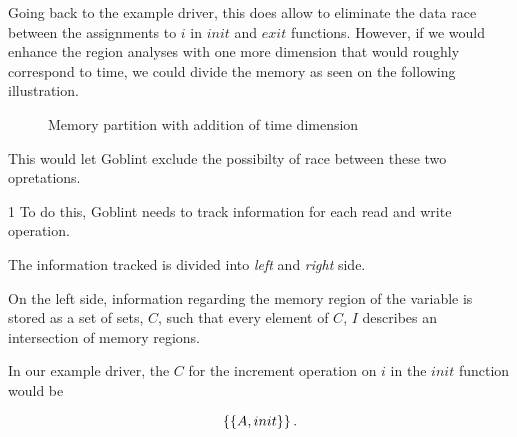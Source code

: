 \documentclass[..thesis.tex]{subfiles}
\newcommand{\opacity}{0.8}
\newcommand{\drawcube}[7]
{
      \filldraw[opacity=\opacity, #7, draw=black, dashed, xzp=#2] (#1,#3) rectangle (#4,#6);
      \filldraw[opacity=\opacity, #7, draw=black, dashed, xzp=#5] (#1,#3) rectangle (#4,#6);
      \filldraw[opacity=\opacity, #7, draw=black, dashed, xyp=#3] (#1,#2) rectangle (#4,#5);
      \filldraw[opacity=\opacity, #7, draw=black, dashed, xyp=#6] (#1,#2) rectangle (#4,#5);
      \filldraw[opacity=\opacity, #7, draw=black, dashed, yzp=#4] (#2,#3) rectangle (#5,#6);
}
\newcommand{\drawcubeoverz}[5]
{
 \drawcube{#1}{#2}{0}{#3}{#4}{\cubez}{#5}
}
\newcommand{\drawoutercube}
{
      \draw[thick,-] (0,0,0) -- ++(\cubex,0,0) -- ++(0,0,\cubez) -- node [anchor = north] {$B$} ++(-0.5*\cubex,0,0) --  node [anchor = north] {$A$} ++(-0.5*\cubex,0,0)  --   ++(0,0,-\cubez);
      \draw[thick,-] (0,\cubey,0) -- ++(\cubex,0,0) -- ++(0,0,\cubez) -- ++(-\cubex,0,0) --   ++(0,0,-\cubez)  ;

      \draw[thick,-] (0,0,0) -- (0,\cubey,0);
      \draw[thick,-] (\cubex,0,0) -- (\cubex,\cubey,0);
      \draw[thick,-] (\cubex,0,\cubez) -- ++(0,\cubey,0);
      \draw[thick,-] (0,0,\cubez) -- (0,\cubey,\cubez);
}
\newcommand{\initColor}{red}
\newcommand{\initLColor}{\initColor!30}
\newcommand{\initRColor}{\initColor!75}
\newcommand{\postInitColor}{blue}
\newcommand{\postInitLColor}{\postInitColor!30}
\newcommand{\postInitRColor}{\postInitColor!75}
\begin{document}
Going back to the example driver, this does allow to eliminate the data race between the assignments to $i$ in $init$ and $exit$ functions. However, if we would enhance the region analyses with one more dimension that would roughly correspond to time, we could divide the memory as seen on the following illustration. 

\begin{figure}[H]
  \centering
    \caption{Memory partition with addition of time dimension}
\end{figure}

This would let Goblint exclude the possibilty of race between these two opretations. 

1
To do this, Goblint needs to track information for each read and write operation.


The information tracked is divided into \textit{left} and \textit{right} side. 

On the left side, information regarding the memory region of the variable is stored as a set of sets, $C$, such that every element of $C$, $I$ describes an intersection of memory regions.

In our example driver, the $C$ for the increment operation on $i$ in the $init$ function would be 

\begin{equation*}
\left\lbrace \left\lbrace A, init \right\rbrace \right\rbrace \text{.}
\end{equation*} 
\end{document}
